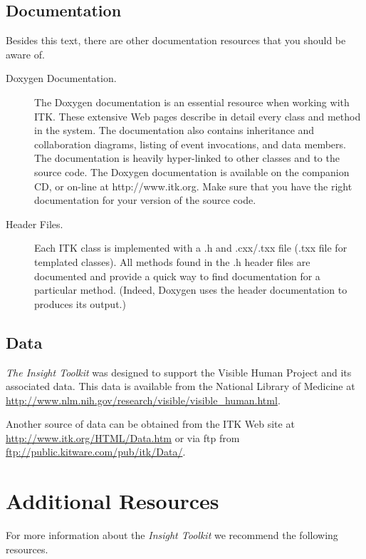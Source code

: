 \subsection{Documentation}
\label{sec:Documentation}

Besides this text, there are other documentation resources that you should be
aware of.
\begin{description}
        \item[Doxygen Documentation.] The Doxygen documentation is an
        essential resource when working with ITK. These extensive Web pages
        describe in detail every class and method in the system. The
        documentation also contains inheritance and collaboration diagrams,
        listing of event invocations, and data members. The documentation is
        heavily hyper-linked to other classes and to the source code. The
        Doxygen documentation is available on the companion CD, or on-line at
        http://www.itk.org. Make sure that you have the right documentation
        for your version of the source code.

	\item[Header Files.] Each ITK class is implemented with a .h and
        .cxx/.txx file (.txx file for templated classes). All methods
        found in the .h header files are documented and provide a quick way
        to find documentation for a particular method. (Indeed, Doxygen uses
        the header documentation to produces its output.)
\end{description}

\subsection{Data}
\label{sec:Data}

\emph{The Insight Toolkit} was designed to support the Visible Human Project 
and its associated data. This data is available from the National Library of
Medicine at \url{http://www.nlm.nih.gov/research/visible/visible_human.html}.

Another source of data can be obtained from the ITK Web site at 
\url{http://www.itk.org/HTML/Data.htm} or via ftp from
\url{ftp://public.kitware.com/pub/itk/Data/}.

\section{Additional Resources}
\label{sec:AdditionalResources}

For more information about the \emph{Insight Toolkit} we recommend the
following resources.

